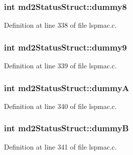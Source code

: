 \hypertarget{structmd2StatusStruct_a17f44367cfa4c66ec3ee481863ef4960}{
\subsubsection[{dummy8}]{\setlength{\rightskip}{0pt plus 5cm}int md2\-Status\-Struct\-::dummy8}}\label{structmd2StatusStruct_a17f44367cfa4c66ec3ee481863ef4960}


Definition at line 338 of file lspmac.\-c.

\hypertarget{structmd2StatusStruct_aa5aadda5a5cb98c6028f8b45e16cd084}{
\subsubsection[{dummy9}]{\setlength{\rightskip}{0pt plus 5cm}int md2\-Status\-Struct\-::dummy9}}\label{structmd2StatusStruct_aa5aadda5a5cb98c6028f8b45e16cd084}


Definition at line 339 of file lspmac.\-c.

\hypertarget{structmd2StatusStruct_a9fc7dc802d00c22463dd7ddd531e06d7}{
\subsubsection[{dummy\-A}]{\setlength{\rightskip}{0pt plus 5cm}int md2\-Status\-Struct\-::dummy\-A}}\label{structmd2StatusStruct_a9fc7dc802d00c22463dd7ddd531e06d7}


Definition at line 340 of file lspmac.\-c.

\hypertarget{structmd2StatusStruct_aab597be69a8dcc140778d9aeb8a50eee}{
\subsubsection[{dummy\-B}]{\setlength{\rightskip}{0pt plus 5cm}int md2\-Status\-Struct\-::dummy\-B}}\label{structmd2StatusStruct_aab597be69a8dcc140778d9aeb8a50eee}


Definition at line 341 of file lspmac.\-c.

